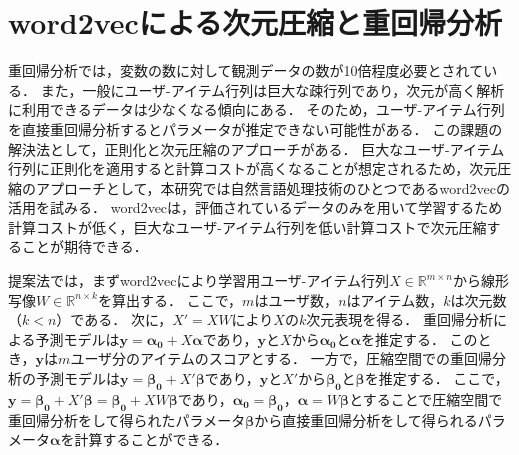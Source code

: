 \section{word2vecによる次元圧縮と重回帰分析}
重回帰分析では，変数の数に対して観測データの数が10倍程度必要とされている\cite{ped}．
また，一般にユーザ-アイテム行列は巨大な疎行列であり，次元が高く解析に利用できるデータは少なくなる傾向にある．
そのため，ユーザ-アイテム行列を直接重回帰分析するとパラメータが推定できない可能性がある．
この課題の解決法として，正則化と次元圧縮のアプローチがある．
巨大なユーザ-アイテム行列に正則化を適用すると計算コストが高くなることが想定されるため，次元圧縮のアプローチとして，本研究では自然言語処理技術のひとつであるword2vec\cite{mik}の活用を試みる．
word2vecは，評価されているデータのみを用いて学習するため計算コストが低く，巨大なユーザ-アイテム行列を低い計算コストで次元圧縮することが期待できる．

提案法では，まずword2vecにより学習用ユーザ-アイテム行列$X \in \mathbb{R}^{m \times n}$から線形写像$W \in \mathbb{R}^{n \times k}$を算出する．
ここで，$m$はユーザ数，$n$はアイテム数，$k$は次元数（$k<n$）である．
次に，$X' = X W$により$X$の$k$次元表現を得る．
重回帰分析による予測モデルは$\boldsymbol{y} =  \boldsymbol{\alpha_0} + X \boldsymbol{\alpha}$であり，$\boldsymbol{y}$と$X$から$\boldsymbol{\alpha_0}$と$\boldsymbol{\alpha}$を推定する．
このとき，$\boldsymbol{y}$は$m$ユーザ分のアイテムのスコアとする．
一方で，圧縮空間での重回帰分析の予測モデルは$\boldsymbol{y} =  \boldsymbol{\beta_0} + X' \boldsymbol{\beta}$であり，$\boldsymbol{y}$と$X'$から$\boldsymbol{\beta_0}$と$\boldsymbol{\beta}$を推定する．
ここで，$\boldsymbol{y} = \boldsymbol{\beta_0} + X' \boldsymbol{\beta} = \boldsymbol{\beta_0} + X W \boldsymbol{\beta}$であり，$\boldsymbol{\alpha_0} = \boldsymbol{\beta_0}$，$\boldsymbol{\alpha} = W \boldsymbol{\beta}$とすることで圧縮空間で重回帰分析をして得られたパラメータ$\boldsymbol{\beta}$から直接重回帰分析をして得られるパラメータ$\boldsymbol{\alpha}$を計算することができる．

